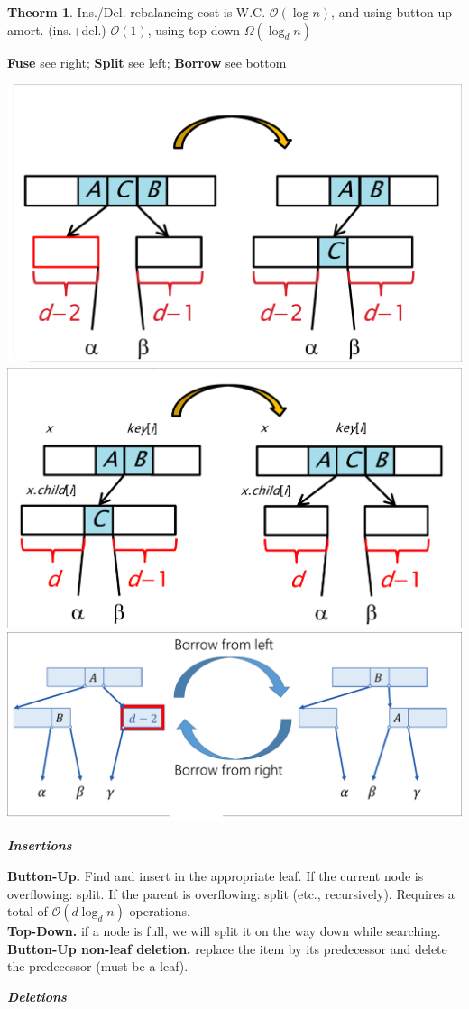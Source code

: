 \documentclass[]{article}
\theoremstyle{definition}
\newtheorem{Theorem}{\color{theoColor}Theorm}
\newcommand\theo  [1] {\begin{Theorem}#1\end{Theorem}}
\newcommand\oc    {\mathcal{O}}
\newcommand\logn      {\log n}
\begin{document}
\begin{multicols}{4}
				\theo{Ins./Del. rebalancing cost is W.C. $\oc(\logn)$, and using button-up amort. (ins.+del.) $\oc(1)$, using top-down $\Omega(\log_dn)$}
				\textbf{Fuse} see right; \textbf{Split} see left; \textbf{Borrow} see bottom \\
				\vspace{-8pt}\begin{center}
					\includegraphics[width=0.45\linewidth]{images/fuse}
					\includegraphics[width=0.485\linewidth]{images/splits} \\
					\includegraphics[width=0.55\linewidth]{images/borrow}
				\end{center}\vspace{-10pt}
				
				\quad\textbf{\textit{Insertions}}
				
					\textbf{Button-Up. }Find and insert in the appropriate leaf. If the current node is overflowing: split. If the parent is overflowing: split (etc., recursively). Requires a total of $\oc(d \log_dn)$ operations. \\
					\textbf{Top-Down. }if a node is full, we will split it on the way down while searching. \\
					\textbf{Button-Up non-leaf deletion. }replace the item by its predecessor and delete the predecessor (must be a leaf). 
				
				\quad\textbf{\textit{Deletions}}
				

\end{multicols}
\end{document}
